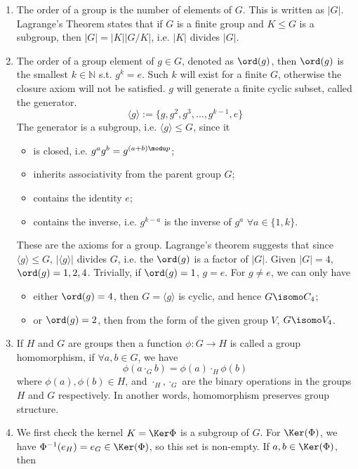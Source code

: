 \documentclass[a4paper]{article}
\begin{document}
\begin{ans}\leavevmode
\begin{enumerate}[label=(\roman*)]
\item The order of a group is the number of elements of $G$. This is written as $|G|$.\\[5pt]
Lagrange's Theorem states that if $G$ is a finite group and $K\leq G$ is a subgroup, then $|G|=|K||G/K|$, i.e. $|K|$ divides $|G|$.
\item The order of a group element of $g\in G$, denoted as $\ord(g)$, then $\ord(g)$ is the smallest $k\in\mathbb{N}$ s.t. $g^k=e$. Such $k$ will exist for a finite $G$, otherwise the closure axiom will not be satisfied. $g$ will generate a finite cyclic subset, called the generator.
$$\langle g\rangle:=\{g,g^2,g^3,\dots,g^{k-1},e\}$$
The generator is a subgroup, i.e. $\langle g\rangle\leq G$, since it 
\begin{itemize}
    \item is closed, i.e. $g^ag^b=g^{(a+b)\modu p}$;
    \item inherits associativity from the parent group $G$;
    \item contains the identity $e$;
    \item contains the inverse, i.e. $g^{k-a}$ is the inverse of $g^a$ $\forall a\in\{1,k\}$.
\end{itemize}
These are the axioms for a group. Lagrange's theorem suggests that since $\langle g\rangle\leq G$, $|\langle g\rangle|$ divides $G$, i.e. the $\ord(g)$ is a factor of $|G|$. Given $|G|=4$, $\ord(g)=1,2,4$. Trivially, if $\ord(g)=1$, $g=e$. For $g\neq e$, we can only have
\begin{itemize}
    \item either $\ord(g)=4$, then $G=\langle g\rangle$ is cyclic, and hence $G\isomo C_4$;
    \item or $\ord(g)=2$, then from the form of the given group $V$, $G\isomo V_4$.
\end{itemize}
\item If $H$ and $G$ are groups then a function $\phi: G\rightarrow H$ is called a group homomorphism, if $\forall a,b\in G$, we have $$\phi(a\cdot_G b)=\phi(a)\cdot_H\phi(b)$$
where $\phi(a),\phi(b)\in H$, and $\cdot_H,\cdot_G$ are the binary operations in the groups $H$ and $G$ respectively. In another words, homomorphism preserves group structure.
\item We first check the kernel $K=\Ker\Phi$ is a subgroup of $G$. For $\Ker(\Phi)$, we have $\Phi^{-1}(e_H)=e_G\in\Ker(\Phi)$, so this set is non-empty. If $a,b\in\Ker(\Phi)$, then

\end{enumerate}
\end{ans}
\end{document}
